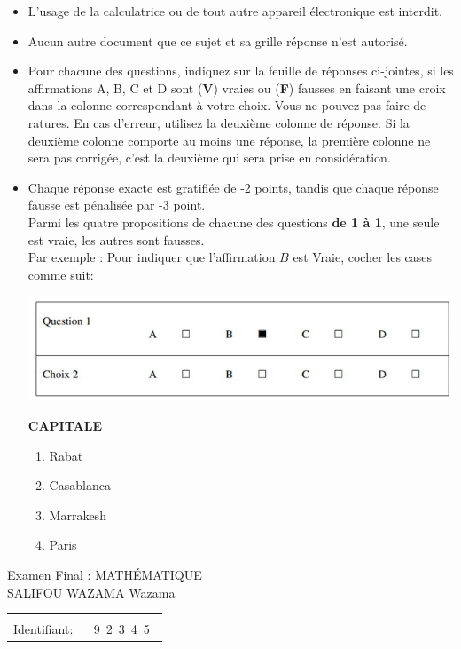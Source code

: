 \documentclass{book}%
\begin{document}
\begin{itemize}%
\item%
L'usage de la calculatrice ou de tout autre appareil électronique est interdit.%
\item%
Aucun autre document que ce sujet et sa grille réponse n'est autorisé.%
\item%
Pour chacune des questions, indiquez sur la feuille de réponses ci-jointes, si les affirmations A, B, C et D sont (\textbf{V}) vraies ou (\textbf{F}) fausses en faisant une croix dans la colonne correspondant à votre choix. Vous ne pouvez pas faire de ratures. En cas d'erreur, utilisez la deuxième colonne de réponse. Si la deuxième colonne comporte au moins une réponse, la première colonne ne sera pas corrigée, c'est la deuxième qui sera prise en considération.%
\item%
Chaque réponse exacte est gratifiée de -2 points, tandis que chaque réponse fausse est pénalisée par -3 point. \\ 	Parmi les quatre propositions de chacune des questions \textbf{de 1 à 1}, une seule est vraie, les autres sont fausses. \\ 	Par exemple : Pour indiquer que l'affirmation $B$ est Vraie, cocher les cases comme suit:  \\ \begin{center}	\includegraphics[scale=0.8]{reponses.png} \end{center}%
\thispagestyle{empty}%
\begin{exercise}%
\textbf{CAPITALE }%
\begin{enumerate}[label=\textbf{\Alph*. }]%
\item%
Rabat%
\item%
Casablanca%
\item%
Marrakesh%
\item%
Paris%
\end{enumerate}%
\end{exercise}%
\end{itemize}%
\newpage%
\thispagestyle{empty}%
Examen Final : MATHÉMATIQUE $\qquad \qquad \qquad \qquad \qquad \qquad \qquad \qquad$ SALIFOU WAZAMA Wazama %
\begin{flushright}%
\begin{tabular}{|l|}%
\hline%
 \\%
\thispagestyle{empty}%
Identifiant: $\quad$ {\Large 9~2~3~4~5~}%
 \\%
\hline%
\end{tabular}%
\end{flushright}%
\end{document}
